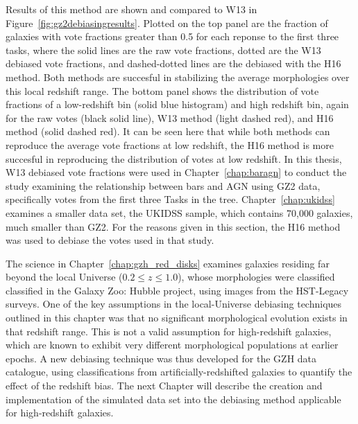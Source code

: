 Results of this method are shown and compared to W13 in Figure~\ref{fig:gz2debiasingresults}. Plotted on the top panel are the fraction of galaxies with vote fractions greater than 0.5 for each reponse to the first three tasks, where the solid lines are the raw vote fractions, dotted are the W13 debiased vote fractions, and dashed-dotted lines are the debiased with the H16 method.  Both methods are succesful in stabilizing the average morphologies over this local redshift range. The bottom panel shows the distribution of vote fractions of a low-redshift bin (solid blue histogram) and high redshift bin, again for the raw votes (black solid line), W13 method (light dashed red), and H16 method (solid dashed red). It can be seen here that while both methods can reproduce the average vote fractions at low redshift, the H16 method is more succesful in reproducing the distribution of votes at low redshift. In this thesis, W13 debiased vote fractions were used in Chapter~\ref{chap:baragn} to conduct the study examining the relationship between bars and AGN using GZ2 data, specifically votes from the first three Tasks in the tree. Chapter~\ref{chap:ukidss} examines a smaller data set, the UKIDSS sample, which contains 70,000 galaxies, much smaller than GZ2. For the reasons given in this section, the H16 method was used to debiase the votes used in that study.

The science in Chapter~\ref{chap:gzh_red_disks} examines galaxies residing far beyond the local Universe ($0.2\le z \le 1.0$), whose morphologies were classified classified in the Galaxy Zoo: Hubble project, using images from the HST-Legacy surveys. One of the key assumptions in the local-Universe debiasing techniques outlined in this chapter was that no significant morphological evolution exists in that redshift range. This is not a valid assumption for high-redshift galaxies, which are known to exhibit very different morphological populations at earlier epochs. A new debiasing technique was thus developed for the GZH data catalogue, using classifications from artificially-redshifted galaxies to quantify the effect of the redshift bias. The next Chapter will describe the creation and implementation of the simulated data set into the debiasing method applicable for high-redshift galaxies. 






